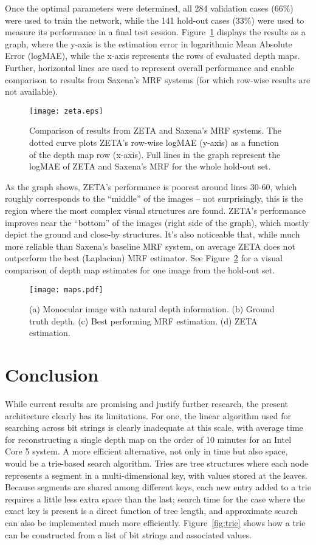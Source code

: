 \documentclass[twocolumn, 9pt]{jsproceedings}
\begin{document}
Once the optimal parameters were determined, all 284 validation cases (66\%) were used to train the network, while the 141 hold-out cases (33\%) were used to measure its performance in a final test session. Figure~\ref{fig:zeta} displays the results as a graph, where the y-axis is the estimation error in logarithmic Mean Absolute Error (logMAE), while the x-axis represents the rows of evaluated depth maps. Further, horizontal lines are used to represent overall performance and enable comparison to results from Saxena's MRF systems (for which row-wise results are not available).

\begin{figure}[h!]
\texttt{[image: zeta.eps]}
\caption{Comparison of results from ZETA and Saxena's MRF systems. The dotted curve plots ZETA's row-wise logMAE (y-axis) as a function of the depth map row (x-axis). Full lines in the graph represent the logMAE of ZETA and Saxena's MRF for the whole hold-out set.}
\label{fig:zeta}
\end{figure}

As the graph shows, ZETA's performance is poorest around lines 30-60, which roughly corresponds to the ``middle'' of the images -- not surprisingly, this is the region where the most complex visual structures are found. ZETA's performance improves near the ``bottom'' of the images (right side of the graph), which mostly depict the ground and close-by structures. It's also noticeable that, while much more reliable than Saxena's baseline MRF system, on average ZETA does not outperform the best (Laplacian) MRF estimator. See Figure~\ref{fig:maps} for a visual comparison of depth map estimates for one image from the hold-out set.

\begin{figure}[h!]
\texttt{[image: maps.pdf]}
\caption{(a) Monocular image with natural depth information. (b) Ground truth depth. (c) Best performing MRF estimation. (d) ZETA estimation.}
\label{fig:maps}
\end{figure}

\section{Conclusion}

While current results are promising and justify further research, the present architecture clearly has its limitations. For one, the linear algorithm used for searching across bit strings is clearly inadequate at this scale, with average time for reconstructing a single depth map on the order of 10 minutes for an Intel Core 5 system. A more efficient alternative, not only in time but also space, would be a trie-based search algorithm. Tries are tree structures where each node represents a segment in a multi-dimensional key, with values stored at the leaves. Because segments are shared among different keys, each new entry added to a trie requires a little less extra space than the last; search time for the case where the exact key is present is a direct function of tree length, and approximate search can also be implemented much more efficiently. Figure~\ref{fig:trie} shows how a trie can be constructed from a list of bit strings and associated values.
\end{document}
